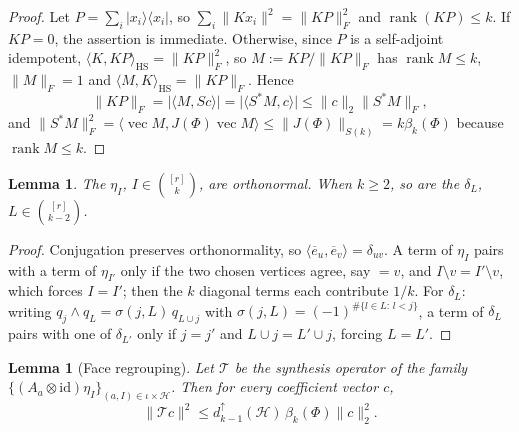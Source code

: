 \documentclass[11pt,reqno]{amsart}
\theoremstyle{plain}
\newtheorem{lemma}[theorem]{Lemma}
\theoremstyle{remark}
\DeclareMathOperator{\rank}{rank}
\newcommand{\id}{\mathrm{id}}
\newcommand{\ketbra}[2]{\lvert #1\rangle\!\langle #2\rvert}
\newcommand{\ip}[2]{\langle #1,#2\rangle}
\newcommand{\norm}[1]{\lVert #1\rVert}
\newcommand{\abs}[1]{\lvert #1\rvert}
\begin{document}
\begin{proof}
Let $P=\sum_i\ketbra{x_i}{x_i}$, so $\sum_i\norm{Kx_i}^2=\norm{KP}_F^2$ and
$\rank(KP)\le k$.  If $KP=0$, the assertion is immediate.  Otherwise, since
$P$ is a self-adjoint idempotent,
$\ip K{KP}_{\mathrm{HS}}=\norm{KP}_F^2$, so $M:=KP/\norm{KP}_F$ has
$\rank M\le k$, $\norm M_F=1$ and $\ip MK_{\mathrm{HS}}=\norm{KP}_F$.  Hence
\[
    \norm{KP}_F=\abs{\ip M{Sc}}=\abs{\ip{S^*M}c}
    \le\norm c_2\norm{S^*M}_F,
\]
and $\norm{S^*M}_F^2=\ip{\operatorname{vec}M}{J(\Phi)\operatorname{vec}M}
\le\norm{J(\Phi)}_{S(k)}=k\beta_k(\Phi)$ because $\rank M\le k$.
\end{proof}

\begin{lemma}
\label{lem:orth}
The $\eta_I$, $I\in\binom{[r]}k$, are orthonormal.  When $k\ge2$, so are the
$\delta_L$, $L\in\binom{[r]}{k-2}$.
\end{lemma}

\begin{proof}
Conjugation preserves orthonormality, so
$\ip{\overline e_u}{\overline e_v}=\delta_{uv}$.  A term of $\eta_I$ pairs with a
term of $\eta_{I'}$ only if the two chosen vertices agree, say $=v$, and
$I\setminus v=I'\setminus v$, which forces $I=I'$; then the $k$ diagonal terms
each contribute $1/k$.  For $\delta_L$: writing
$q_j\wedge q_L=\sigma(j,L)\,q_{L\cup j}$ with
$\sigma(j,L)=(-1)^{\#\{l\in L:\,l<j\}}$, a term of $\delta_L$ pairs with one of
$\delta_{L'}$ only if $j=j'$ and $L\cup j=L'\cup j$, forcing $L=L'$.
\end{proof}

\begin{lemma}[Face regrouping]
\label{lem:regroup}
Let $\mathcal T$ be the synthesis operator of the family
$\{(A_a\otimes\id)\eta_I\}_{(a,I)\in\iota\times\mathcal H}$.  Then for every
coefficient vector $c$,
\[
    \norm{\mathcal Tc}^2\le d^\uparrow_{k-1}(\mathcal H)\,\beta_k(\Phi)\norm c_2^2 .
\]
\end{lemma}
\end{document}
